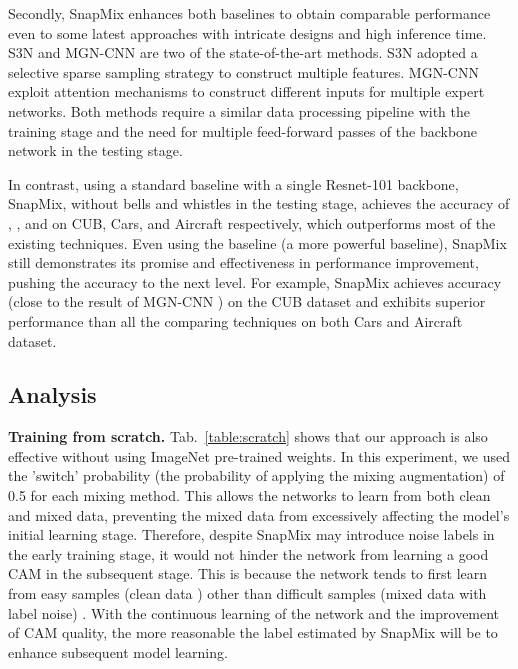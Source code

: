 \documentclass[letterpaper]{article} \usepackage{aaai21}  \usepackage{times}  \usepackage{helvet} \usepackage{courier}  \usepackage[hyphens]{url}  \usepackage{graphicx} \urlstyle{rm} \def\UrlFont{\rm}  \usepackage{natbib}  \usepackage{caption} \frenchspacing  \setlength{\pdfpagewidth}{8.5in}  \setlength{\pdfpageheight}{11in}
\begin{document}
Secondly, SnapMix enhances both baselines to obtain comparable performance even to some latest approaches with intricate designs and high inference time.  S3N \cite{ding2019selective}  and MGN-CNN \cite{zhang2019learning} are two of the state-of-the-art methods. S3N adopted a selective sparse sampling strategy to construct multiple features. MGN-CNN exploit attention mechanisms to construct different inputs for multiple expert networks. Both methods require a similar data processing pipeline with the training stage and the need for multiple feed-forward passes of the backbone network in the testing stage.
\iffalse
\begin{figure}[t]
  \begin{center}
    \texttt{[image: LaTeX/curve.pdf]}
  \end{center}
  \caption{Test accuracy curve comparison of different augmentation methods.}
  \label{fig:curve}
\end{figure}
\fi


In contrast, using a standard baseline with a single Resnet-101 backbone, SnapMix, without bells and whistles in the testing stage,  achieves the accuracy of , , and  on CUB, Cars, and Aircraft respectively, which outperforms most of the existing techniques. Even using the baseline (a more powerful baseline), SnapMix still demonstrates its promise and effectiveness in performance improvement, pushing the accuracy to the next level.  For example, SnapMix achieves  accuracy (close to the result of MGN-CNN )   on the CUB dataset and exhibits superior performance than all the comparing techniques on both Cars and Aircraft dataset.




\subsection{Analysis}



\noindent\textbf{Training from scratch.} Tab.~\ref{table:scratch} shows that our approach is also effective without using ImageNet pre-trained weights. In this experiment, we used the 'switch' probability (the probability of applying the mixing augmentation) of 0.5 for each mixing method. This allows the networks to learn from both clean and mixed data, preventing the mixed data from excessively affecting the model's initial learning stage. Therefore, despite SnapMix may introduce noise labels in the early training stage, it would not hinder the network from learning a good CAM in the subsequent stage. This is because the network tends to first learn from easy samples (clean data ) other than difficult samples (mixed data with label noise) \cite{arpit2017closer}. With the continuous learning of the network and the improvement of CAM quality, the more reasonable the label estimated by SnapMix will be to enhance subsequent model learning.
\end{document}

